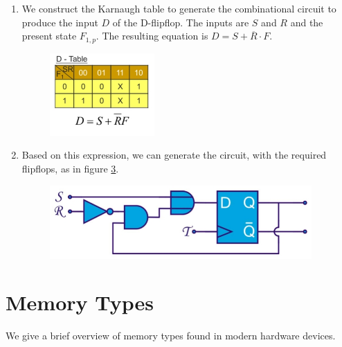 \begin{enumerate}
\begin{figure}[h!]
		\label{fig:design10}
	\end{figure}
	\item We construct the Karnaugh table to generate the combinational circuit to produce the input $D$ of the D-flipflop. The inputs are $S$ and $R$ and the present state $F_{1,p}$. The resulting equation is $D = S + \overline{R}\cdot F$.
	\begin{figure}[h!]
		\centering
		\includegraphics[width=4cm]{figures/ch17/design11.jpg}
		\caption{}
		\label{fig:design11}
	\end{figure}
	\item Based on this expression, we can generate the circuit, with the required flipflops, as in figure \ref{fig:design12}.
	\begin{figure}[h!]
		\centering
		\includegraphics[width=10cm]{figures/ch17/design12.jpg}
		\caption{}
		\label{fig:design12}
	\end{figure}
\end{enumerate}

\section{Memory Types}
We give a brief overview of memory types found in modern hardware devices.
